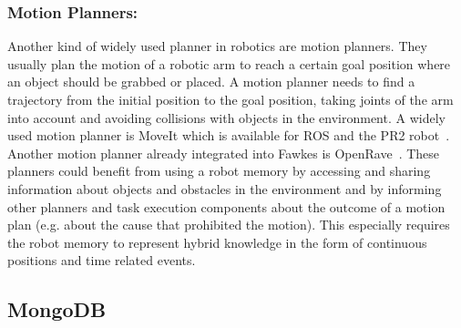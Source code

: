\documentclass[a4paper,11pt]{article}
\begin{document}
\subsubsection{Motion Planners:}
Another kind of widely used planner in robotics are motion
planners. They usually plan the motion of a robotic arm to reach a
certain goal position where an object should be grabbed or placed. A
motion planner needs to find a trajectory from the initial position to
the goal position, taking joints of the arm into account and avoiding
collisions with objects in the environment. A widely used motion
planner is MoveIt which is available for ROS and the PR2
robot~\cite{MoveIt}. Another motion planner already integrated into
Fawkes is OpenRave~\cite{OpenRave}. These planners could benefit from
using a robot memory by accessing and sharing information about
objects and obstacles in the environment and by informing other
planners and task execution components about the outcome of a motion
plan (e.g. about the cause that prohibited the motion). This
especially requires the robot memory to represent hybrid knowledge in
the form of continuous positions and time related events.

\subsection{MongoDB}
\label{sec:mongodb}
\end{document}
